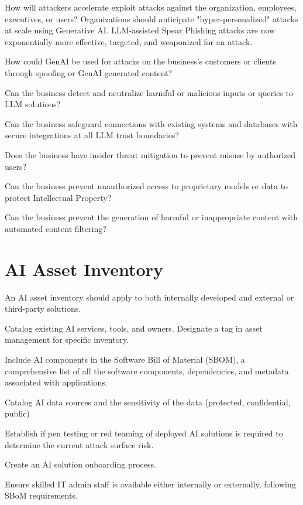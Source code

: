 \begin{minipage}{\linewidth}
\begin{checklist}
  \item How will attackers accelerate exploit attacks against the organization,
  employees, executives, or users? Organizations should anticipate
  "hyper-personalized" attacks at scale using Generative AI. LLM-assisted Spear
  Phishing attacks are now exponentially more effective, targeted, and
  weaponized for an attack.
  \item How could GenAI be used for attacks on the business's customers or
  clients through spoofing or GenAI generated content?
  \item Can the business detect and neutralize harmful or malicious inputs or
  queries to LLM solutions?
  \item Can the business safeguard connections with existing systems and
  databases with secure integrations at all LLM trust boundaries?
  \item Does the business have insider threat mitigation to prevent misuse by
  authorized users?
  \item Can the business prevent unauthorized access to proprietary models or
  data to protect Intellectual Property?
  \item Can the business prevent the generation of harmful or inappropriate
  content with automated content filtering?
\end{checklist}
\end{minipage}

\section{AI Asset Inventory}
An AI asset inventory should apply to both internally developed and external
or third-party solutions.

\begin{minipage}{\linewidth}
\begin{checklist}
  \item Catalog existing AI services, tools, and owners. Designate a tag in
  asset management for specific inventory.
  \item Include AI components in the Software Bill of Material (SBOM), a
  comprehensive list of all the software components, dependencies, and
  metadata associated with applications.
  \item Catalog AI data sources and the sensitivity of the data (protected,
  confidential, public)
  \item Establish if pen testing or red teaming of deployed AI solutions is
  required to determine the current attack surface risk.
  \item Create an AI solution onboarding process.
  \item Ensure skilled IT admin staff is available either internally or
  externally, following SBoM requirements.
\end{checklist}
\end{minipage}

